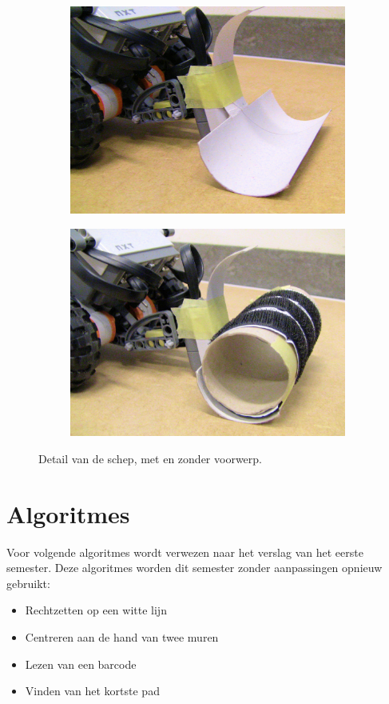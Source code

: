 \documentclass[tt1]{penoverslag}
\begin{document}
\begin{figure}
\centering
	\begin{subfigure}[h]{0.46\textwidth}
	\centering
		\includegraphics[width=\textwidth]{schepZonder}
	\end{subfigure}%
	\begin{subfigure}[h]{0.46\textwidth}
		\centering
		\includegraphics[width=\textwidth]{schepMet}
\end{subfigure}
\caption{Detail van de schep, met en zonder voorwerp.}
\label{fig:robotSchep}
\end{figure}


\section{Algoritmes}
Voor volgende algoritmes wordt verwezen naar het verslag van het eerste semester. Deze algoritmes worden dit semester zonder aanpassingen opnieuw gebruikt:
\begin{itemize}
	\item Rechtzetten op een witte lijn
	\item Centreren aan de hand van twee muren
	\item Lezen van een barcode
	\item Vinden van het kortste pad
\end{itemize}
\end{document}
